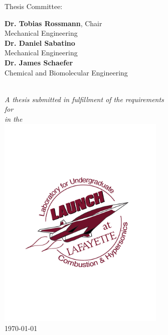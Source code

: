 \documentclass[11pt, oneside]{LaunchThesis} %
\begin{document}
\begin{titlepage}
\begin{center}
\begin{minipage}{0.8\textwidth}
\begin{center}
Thesis Committee:\\
\begin{raggedleft}
\textbf{Dr. Tobias Rossmann}, Chair\\
Mechanical Engineering\\
\textbf{Dr. Daniel Sabatino}\\
Mechanical Engineering\\
\textbf{Dr. James Schaefer}\\
Chemical and Biomolecular Engineering\\
\end{raggedleft}
\end{center}
\end{minipage}\\[1cm]
\large \textit{A thesis submitted in fulfillment of the requirements\\ for  \degreename}\\[0.0cm] %
\textit{in the}\\[0.2cm]
\href{http://sites.lafayette.edu/rossmant/research}{\includegraphics[width = 0.60\textwidth,trim = 0mm 70mm 0mm 70mm, clip]{Launch_Circle_Logo.pdf}}\\
{\large \today}\\[0cm] %

 
\vfill
\end{center}

\end{titlepage}
\end{document}
